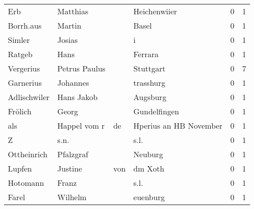 \begin{center}
\begin{tiny}
\begin{longtabu}{llllrr}
                      Erb &                           Matthias &             &                                Heichenwiier &          0 &         1 \\
                Borrh.aus &                             Martin &             &                                       Basel &          0 &         1 \\
                   Simler &                             Josias &             &                                           i &          0 &         1 \\
                   Ratgeb &                               Hans &             &                                     Ferrara &          0 &         1 \\
                Vergerius &                      Petrus Paulus &             &                                   Stuttgart &          0 &         7 \\
                Garnerius &                           Johannes &             &                                   trasshurg &          0 &         1 \\
             Adlischwiler &                         Hans Jakob &             &                                    Augsburg &          0 &         1 \\
                  Frölich &                              Georg &             &                                Gundelfingen &          0 &         1 \\
                      als &                       Happel vom r &          de &                      Hperius an HB November &          0 &         1 \\
                        Z &                               s.n. &             &                                        s.l. &          0 &         1 \\
              Ottheinrich &                          Pfalzgraf &             &                                     Neuburg &          0 &         1 \\
                   Lupfen &                            Justine &         von &                                     dm Xoth &          0 &         1 \\
                 Hotomann &                              Franz &             &                                        s.l. &          0 &         1 \\
                    Farel &                            Wilhelm &             &                                    euenburg &          0 &         1 \\

\end{longtabu}
\end{tiny}
\end{center}
